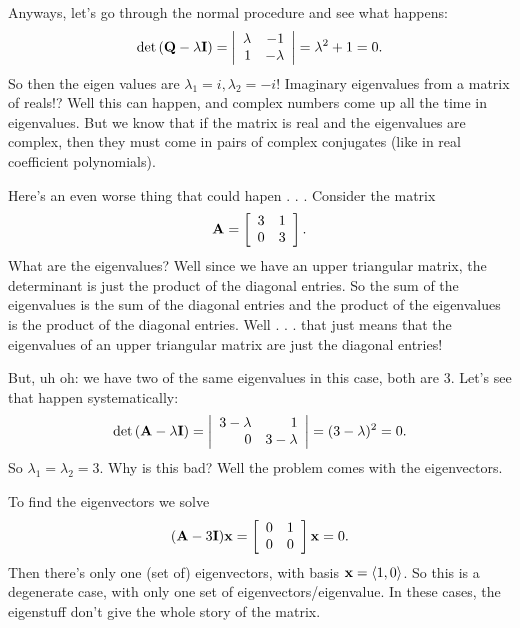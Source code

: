 Anyways, let's go through the normal procedure and see what happens:
\[ \mathrm{det}\, (\boldsymbol{\mathbf{Q}} - \lambda \boldsymbol{\mathbf{I}}) = \left| \begin{array}{rrrrrrrrrrrrrrrrrrrrrrrrr} \lambda&-1\\1&-\lambda\\ \end{array} \right| = \lambda^2 + 1 = 0. \]
So then the eigen values are $\lambda_1 = i, \lambda_2 = -i$! Imaginary eigenvalues from a matrix of reals!? Well this can happen, and complex numbers come up all the time in eigenvalues. But we know that if the matrix is real and the eigenvalues are complex, then they must come in pairs of complex conjugates (like in real coefficient polynomials).  
\eex

Here's an even worse thing that could hapen . . .
\bex
Consider the matrix
\[ \boldsymbol{\mathbf{A}} = \left[ \begin{array}{rrrrrrrrrrrrrrrrrrrrrrrrr} 3&1\\0&3\\ \end{array} \right]. \]
What are the eigenvalues? Well since we have an upper triangular matrix, the determinant is just the product of the diagonal entries. So the sum of the eigenvalues is the sum of the diagonal entries and the product of the eigenvalues is the product of the diagonal entries. Well . . . that just means that the eigenvalues of an upper triangular matrix are just the diagonal entries!

But, uh oh: we have two of the same eigenvalues in this case, both are 3. Let's see that happen systematically:
\[ \mathrm{det}\, (\boldsymbol{\mathbf{A}} - \lambda \boldsymbol{\mathbf{I}}) = \left| \begin{array}{rrrrrrrrrrrrrrrrrrrrrrrrr} 3-\lambda&1\\0&3-\lambda\\ \end{array} \right| = (3-\lambda)^2 = 0. \]
So $\lambda_1 = \lambda_2 = 3$. Why is this bad? Well the problem comes with the eigenvectors. 

To find the eigenvectors we solve
\[ (\boldsymbol{\mathbf{A}} - 3\boldsymbol{\mathbf{I}})\boldsymbol{\mathbf{x}} = \left[ \begin{array}{rrrrrrrrrrrrrrrrrrrrrrrrr} 0&1\\0&0\\ \end{array} \right]\boldsymbol{\mathbf{x}} = 0. \]
Then there's only one (set of) eigenvectors, with basis $\boldsymbol{\mathbf{x}} = \langle 1,0 \rangle$. So this is a degenerate case, with only one set of eigenvectors/eigenvalue. In these cases, the eigenstuff don't give the whole story of the matrix.
\eex